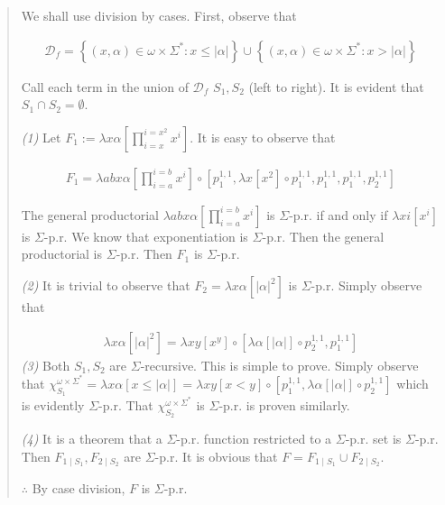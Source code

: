 \documentclass[a4paper, 12pt]{article}
\begin{document}
\small
\begin{quote}

We shall use division by cases. First, observe that 

\begin{align*}
    \mathcal{D}_f = \left\{ (x, \alpha) \in \omega \times \Sigma^{*} : x \leq |\alpha| \right\} \cup \left\{
    (x, \alpha) \in \omega \times \Sigma^{*} : x > |\alpha|\right\} 
\end{align*}

Call each term in the union of $\mathcal{D}_f$ $S_1, S_2$ (left to right). It is
evident that $S_1 \cap S_2 = \emptyset$. 

\textit{(1)} Let $F_1 := \lambda x \alpha \left[ \prod_{i=x}^{i=x^2} x^i
\right]$. It is easy to observe that 

\begin{align*}
    F_1 = \lambda abx \alpha \left[  \prod_{i=a}^{i = b} x^i    \right] \circ
    \left[ p_1^{1, 1}, \lambda x \left[ x^2 \right] \circ p_1^{1, 1}, p_1^{1,
    1}, p_1^{1, 1}, p_2^{1, 1} \right] 
\end{align*}

The general productorial $\lambda abx\alpha \left[ \prod_{i=a}^{i=b} x^i
\right]$ is $\Sigma$-p.r. if and only if $\lambda x i \left[ x^i  \right]$ is
$\Sigma$-p.r. We know that exponentiation is $\Sigma$-p.r. Then the general
productorial is $\Sigma$-p.r. Then $F_1$ is $\Sigma$-p.r. 

\textit{(2)} It is trivial to observe that $F_2 = \lambda x\alpha \left[
|\alpha|^2  \right]$ is $\Sigma$-p.r. Simply observe that

\begin{align*}
    \lambda x\alpha[|\alpha|^2] = \lambda xy \left[ x^y  \right] \circ \left[ \lambda \alpha \left[ |\alpha|
    \right] \circ p_{2}^{1, 1}, p_1^{1, 1} \right] 
\end{align*}
\textit{(3)} Both $S_1, S_2$ are $\Sigma$-recursive. This is simple to prove.
Simply observe that $\chi_{S_1}^{\omega \times \Sigma^{*}} = \lambda x\alpha
\left[ x \leq |\alpha|  \right] = \lambda xy \left[ x < y  \right] \circ \left[
p_1^{1, 1}, \lambda \alpha \left[ |\alpha|  \right]\circ p_2^{1, 1}\right] $
which is evidently $\Sigma$-p.r. That $\chi_{S_2}^{\omega \times \Sigma^{*}}$ is
$\Sigma$-p.r. is proven similarly.

\textit{(4)} It is a theorem that a $\Sigma$-p.r. function restricted to a
$\Sigma$-p.r. set is $\Sigma$-p.r. Then $F_{1 \mid S_1}, F_{2 \mid S_2}$ are
$\Sigma$-p.r. It is obvious that $F = F_{1 \mid S_1} \cup F_{2 \mid S_2}$. 

$\therefore $ By case division, $F$ is $\Sigma$-p.r. 


\end{quote}
\normalsize
\end{document}
